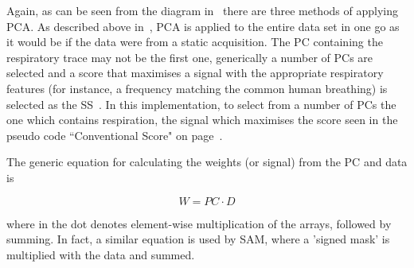                 Again, as can be seen from the diagram in~ there are three methods of applying \gls{PCA}. As described above in~, \gls{PCA} is applied to the entire data set in one go as it would be if the data were from a static acquisition. The \gls{PC} containing the respiratory trace may not be the first one, generically a number of \glspl{PC} are selected and a score that maximises a signal with the appropriate respiratory features (for instance, a frequency matching the common human breathing) is selected as the \gls{SS}~\parencite{Bertolli2017}. In this implementation, to select from a number of \glspl{PC} the one which contains respiration, the signal which maximises the score seen in the pseudo code ``Conventional Score" on page~\pageref{alg:pca_data_driven_surrogate_signal_extraction_methods_for_dynamic_pet_methods_conventional_pca_conventional_score_pseudo_code}.
                
                The generic equation for calculating the weights (or signal) from the \gls{PC} and data is
                    
                \begin{equation} \label{eq:pca_data_driven_surrogate_signal_extraction_methods_for_dynamic_pet_methods_conventional_pca_conventional_score_pseudo_code_pc_weights}
                    W = PC \cdot D
                \end{equation}
                    
                \noindent where in  the dot denotes element-wise multiplication of the arrays, followed by summing. In fact, a similar equation is used by \gls{SAM}, where a 'signed mask' is multiplied with the data and summed.

